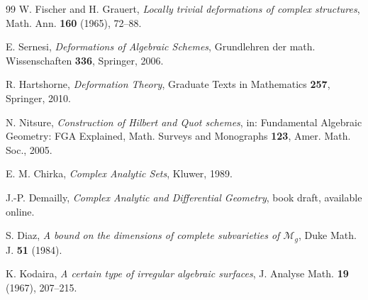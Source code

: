 \documentclass[11pt]{amsart}
\theoremstyle{plain}
\theoremstyle{definition}
\theoremstyle{remark}
\begin{document}
\begin{thebibliography}{99}
 W. Fischer and H. Grauert, \emph{Locally trivial deformations of complex
structures}, Math. Ann. \textbf{160} (1965), 72--88.

 E. Sernesi, \emph{Deformations of Algebraic Schemes}, Grundlehren
der math. Wissenschaften \textbf{336}, Springer, 2006.

 R. Hartshorne, \emph{Deformation Theory}, Graduate Texts in
Mathematics \textbf{257}, Springer, 2010.

 N. Nitsure, \emph{Construction of Hilbert and Quot schemes}, in:
Fundamental Algebraic Geometry: FGA Explained, Math. Surveys and Monographs
\textbf{123}, Amer. Math. Soc., 2005.

 E. M. Chirka, \emph{Complex Analytic Sets}, Kluwer, 1989.

 J.-P. Demailly, \emph{Complex Analytic and Differential Geometry},
book draft, available online.

 S. Diaz, \emph{A bound on the dimensions of complete subvarieties of
$\mathcal M_g$}, Duke Math. J. \textbf{51} (1984).

 K. Kodaira, \emph{A certain type of irregular algebraic surfaces},
J. Analyse Math. \textbf{19} (1967), 207--215.

\end{thebibliography}
\end{document}
